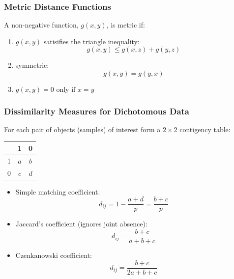 \documentclass{beamer}
\begin{document}
\begin{frame}
  \frametitle{Metric  Distance Functions}

A non-negative function, $g(x,y)$, is \alert{metric} if:

\begin{enumerate}

\item $g(x,y)$ satisifies the triangle inequality:
\[
g(x,y) \leq  g(x,z) + g(y,z)
\]

\item symmetric:
\[
g(x,y) = g(y,x)
\] 

\item $g(x,y) =0$ only if $x = y$



\end{enumerate}
\end{frame}


\begin{frame}
  \frametitle{Dissimilarity Measures for Dichotomous Data}

For each pair of objects (samples) of interest form a $2 \times 2$ contigency table:

\begin{center}
\begin{tabular}{l|cc}
   & 1 & 0 \\
\midrule
1 & $a$ & $b$ \\
0 & $c$ & $d$ \\
\end{tabular}
\end{center}

\begin{itemize}

\item Simple matching coefficient: 
\[
d_{ij} = 1 - \frac{a + d}{p} = \frac{b + c}{p}
\]

\item Jaccard's coefficient (ignores joint absence):
\[
d_{ij} =  \frac{b + c}{a + b + c}
\]


\item Czenkanowski coefficient: 
\[
d_{ij} = \frac{b + c}{2a + b + c}
\]


\end{itemize}
\end{frame}
\end{document}

